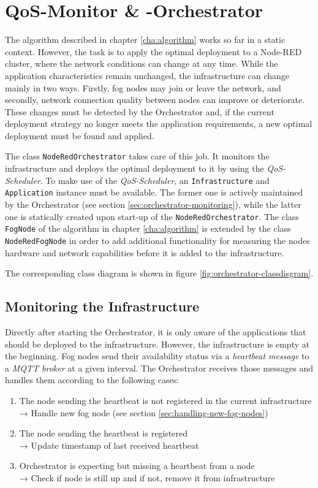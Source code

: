 \chapter{QoS-Monitor \& -Orchestrator\label{cha:orchestrator}}

The algorithm described in chapter \ref{cha:algorithm} works so far in a static context.
However, the task is to apply the optimal deployment to a Node-RED cluster, where the network conditions can change at any time. While the application characteristics remain unchanged, the infrastructure can change mainly in two ways. Firstly, fog nodes may join or leave the network, and secondly, network connection quality between nodes can improve or deteriorate. These changes must be detected by the Orchestrator and, if the current deployment strategy no longer meets the application requirements, a new optimal deployment must be found and applied.

The class \texttt{NodeRedOrchestrator} takes care of this job.
It monitors the infrastructure and deploys the optimal deployment to it by using the \textit{QoS-Scheduler}.
To make use of the \textit{QoS-Scheduler}, an \texttt{Infrastructure} and \texttt{Application} instance must be available. The former one is actively maintained by the Orchestrator (see section \ref{sec:orchestrator-monitoring}), while the latter one is statically created upon start-up of the \texttt{NodeRedOrchestrator}.
The class \texttt{FogNode} of the algorithm in chapter \ref{cha:algorithm} is extended by the class \texttt{NodeRedFogNode} in order to add additional functionality for measuring the nodes hardware and network capabilities before it is added to the infrastructure.

The corresponding class diagram is shown in figure \ref{fig:orchestrator-classdisgram}.

\section{Monitoring the Infrastructure\label{sec:orchestrator-monitoring}}

Directly after starting the Orchestrator, it is only aware of the applications that should be deployed to the infrastructure. However, the infrastructure is empty at the beginning. Fog nodes send their availability status via a \textit{heartbeat message} to a \textit{MQTT broker} at a given interval.
The Orchestrator receives those messages and handles them according to the following cases:
\begin{enumerate}
    \item The node sending the heartbeat is not registered in the current infrastructure\\
    → Handle new fog node (see section \ref{sec:handling-new-fog-nodes})
    \item The node sending the heartbeat is registered\\
    → Update timestamp of last received heartbeat
    \item Orchestrator is expecting but missing a heartbeat from a node\\
    → Check if node is still up and if not, remove it from infrastructure
\end{enumerate}

